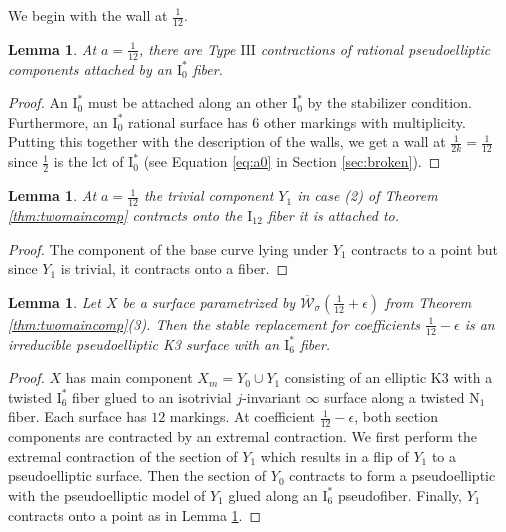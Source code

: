 \documentclass[11pt]{amsart}
\newtheorem{lemma}[theorem]{Lemma}
\theoremstyle{definition}
\theoremstyle{remark}
\newcommand{\calW}{\mathcal W}
\newcommand{\ktwelve}{\overline{\calW}_\sigma({\frac{1}{12}+\epsilon})}
\begin{document}
	We begin with the wall at $\frac{1}{12}$. 
	
	\begin{lemma}\label{lem:I*point} At $a = \frac{1}{12}$, there are Type $\mathrm{III}$ contractions of rational pseudoelliptic components attached by an $\mathrm{I}_0^*$ fiber. \end{lemma} 
	
	\begin{proof} An $\mathrm{I}_0^*$ must be attached along an other $\mathrm{I}_0^*$ by the stabilizer condition. Furthermore, an $\mathrm{I}_0^*$ rational surface has $6$ other markings with multiplicity. Putting this together with the description of the walls, we get a wall at $\frac{1}{2k} = \frac{1}{12}$ since $\frac{1}{2}$ is the lct of $\mathrm{I}_0^*$ (see Equation \ref{eq:a0} in Section \ref{sec:broken}). \end{proof} 
	
	\begin{lemma} At $a = \frac{1}{12}$ the trivial component $Y_1$ in case (2) of Theorem \ref{thm:twomaincomp} contracts onto the $\mathrm{I}_{12}$ fiber it is attached to. \end{lemma} 
	
	\begin{proof} The component of the base curve lying under $Y_1$ contracts to a point but since $Y_1$ is trivial, it contracts onto a fiber. \end{proof} 
	
	\begin{lemma} Let $X$ be a surface parametrized by $\ktwelve$ from Theorem \ref{thm:twomaincomp}(3). Then the stable replacement for coefficients $\frac{1}{12} - \epsilon$ is an irreducible pseudoelliptic K3 surface with an $\mathrm{I}_6^*$ fiber. \end{lemma} 
	\begin{proof} $X$ has main component $X_m = Y_0 \cup Y_1$ consisting of an elliptic K3 with a twisted $\mathrm{I}_6^*$ fiber glued to an isotrivial $j$-invariant $\infty$ surface along a twisted $\mathrm{N}_1$ fiber. Each surface has $12$ markings. At coefficient $\frac{1}{12} - \epsilon$, both section components are contracted by an extremal contraction. We first perform the extremal contraction of the section of $Y_1$ which results in a flip of $Y_1$ to a pseudoelliptic surface. Then the section of $Y_0$ contracts to form a pseudoelliptic with the pseudoelliptic model of $Y_1$ glued along an $\mathrm{I}_6^*$ pseudofiber. Finally, $Y_1$ contracts onto a point as in Lemma \ref{lem:I*point}.  \end{proof} 
	
\end{document}
